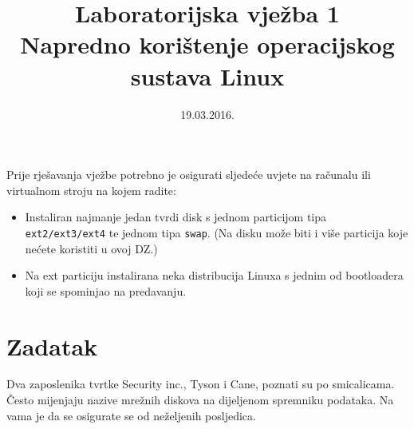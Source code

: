 \documentclass[12pt,a4paper]{article}
\begin{document}
	\title{Laboratorijska vježba 1\\{\large Napredno korištenje operacijskog sustava Linux}}
	\date{\vspace{-5ex} 19.03.2016.}
   \maketitle
    \noindent Prije rješavanja vježbe potrebno je osigurati sljedeće uvjete na računalu ili virtualnom stroju na kojem radite:
    
    \begin{itemize}
        \item Instaliran najmanje jedan tvrdi disk s jednom particijom tipa \texttt{ext2/ext3/ext4} te jednom tipa \texttt{swap}. {\small (Na disku može biti i više  particija koje nećete koristiti u ovoj DZ.)}
        \item Na ext particiju instalirana neka distribucija Linuxa s jednim od bootloadera koji se spominjao na predavanju.
    \end{itemize}


    \section{Zadatak}
    Dva zaposlenika tvrtke Security inc., Tyson i Cane, poznati su po smicalicama. Često mijenjaju nazive mrežnih diskova na dijeljenom spremniku podataka. Na vama je da se osigurate se od neželjenih posljedica. \\ 
    
\end{document}

